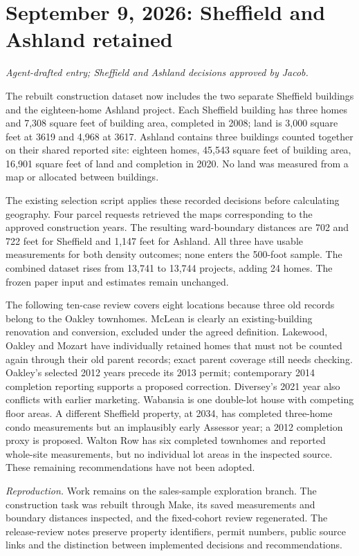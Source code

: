 \clearpage
\section*{September 9, 2026: Sheffield and Ashland retained}
\textit{Agent-drafted entry; Sheffield and Ashland decisions approved by Jacob.}

The rebuilt construction dataset now includes the two separate Sheffield buildings and the eighteen-home Ashland project. Each Sheffield building has three homes and 7,308 square feet of building area, completed in 2008; land is 3,000 square feet at 3619 and 4,968 at 3617. Ashland contains three buildings counted together on their shared reported site: eighteen homes, 45,543 square feet of building area, 16,901 square feet of land and completion in 2020. No land was measured from a map or allocated between buildings.

The existing selection script applies these recorded decisions before calculating geography. Four parcel requests retrieved the maps corresponding to the approved construction years. The resulting ward-boundary distances are 702 and 722 feet for Sheffield and 1,147 feet for Ashland. All three have usable measurements for both density outcomes; none enters the 500-foot sample. The combined dataset rises from 13,741 to 13,744 projects, adding 24 homes. The frozen paper input and estimates remain unchanged.

The following ten-case review covers eight locations because three old records belong to the Oakley townhomes. McLean is clearly an existing-building renovation and conversion, excluded under the agreed definition. Lakewood, Oakley and Mozart have individually retained homes that must not be counted again through their old parent records; exact parent coverage still needs checking. Oakley's selected 2012 years precede its 2013 permit; contemporary 2014 completion reporting supports a proposed correction. Diversey's 2021 year also conflicts with earlier marketing. Wabansia is one double-lot house with competing floor areas. A different Sheffield property, at 2034, has completed three-home condo measurements but an implausibly early Assessor year; a 2012 completion proxy is proposed. Walton Row has six completed townhomes and reported whole-site measurements, but no individual lot areas in the inspected source. These remaining recommendations have not been adopted.

\medskip
\noindent\textit{Reproduction.} Work remains on the sales-sample exploration branch. The construction task was rebuilt through Make, its saved measurements and boundary distances inspected, and the fixed-cohort review regenerated. The release-review notes preserve property identifiers, permit numbers, public source links and the distinction between implemented decisions and recommendations.
